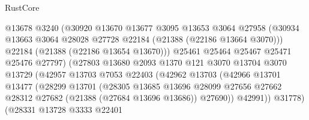 \begin{lexlean}{RustCore}
\begin{coremodule}
                                @13678
                                @3240
                                (@30920
                                  @13670
                                  @13677
                                  @3095
                                  @13653
                                  @3064
                                  @27958
                                  (@30934
                                    @13663
                                    @3064
                                    @28028
                                    @27728
                                    @22184
                                    (@21388 (@22186 @13664 @3070)))
                                  @22184
                                  (@21388 (@22186 @13654 @13670)))
                                @25461
                                @25464
                                @25467
                                @25471
                                @25476
                                @27797)
                              (@27803
                                @13680
                                @2093
                                @1370
                                @121
                                @3070
                                @13704
                                @3070
                                @13729
                                (@42957
                                  @13703
                                  @7053
                                  @22403
                                  (@42962
                                    @13703
                                    (@42966
                                      @13701
                                      @13477
                                      (@28299
                                        @13701
                                        (@28305
                                          @13685
                                          @13696
                                          @28099
                                          @27656
                                          @27662
                                          @28312
                                          @27682
                                          (@21388 (@27684 @13696 @13686))
                                          @27690))
                                      @42991))
                                  @31778)
                                (@28331
                                  @13728
                                  @3333
                                  @22401

\end{coremodule}
\end{lexlean}
